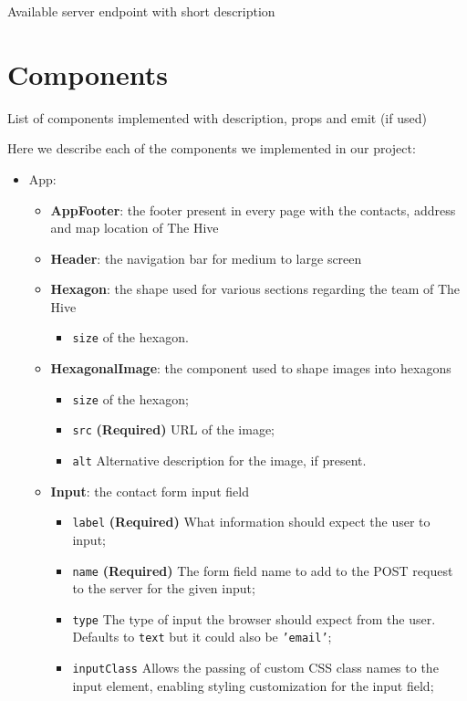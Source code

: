 \vspace{1em}
Available server endpoint with short description

\section{Components}
List of components implemented with description, props and emit (if used)

Here we describe each of the components we implemented in our project:
\begin{itemize}
    \item App:
    \begin{itemize}
        \item \textbf{AppFooter}: the footer present in every page with the contacts, address and map location of The Hive
        \item \textbf{Header}: the navigation bar for medium to large screen
        \item \textbf{Hexagon}: the shape used for various sections regarding the team of The Hive
        \begin{itemize}
            \item \texttt{size} of the hexagon.
        \end{itemize}
        \item \textbf{HexagonalImage}: the component used to shape images into hexagons
        \begin{itemize}
            \item \texttt{size} of the hexagon;
            \item \texttt{src} \textbf{(Required)} URL of the image;
            \item \texttt{alt} Alternative description for the image, if present.
        \end{itemize}
        \item \textbf{Input}: the contact form input field
        \begin{itemize}
            \item \texttt{label} \textbf{(Required)} What information should expect the user to input;
            \item \texttt{name} \textbf{(Required)} The form field name to add to the POST request to the server for the given input;
            \item \texttt{type} The type of input the browser should expect from the user. Defaults to \texttt{text} but it could also be \texttt{'email'};
            \item \texttt{inputClass} Allows the passing of custom CSS class names to the input element, enabling styling customization for the input field;

\end{itemize}
\end{itemize}
\end{itemize}
